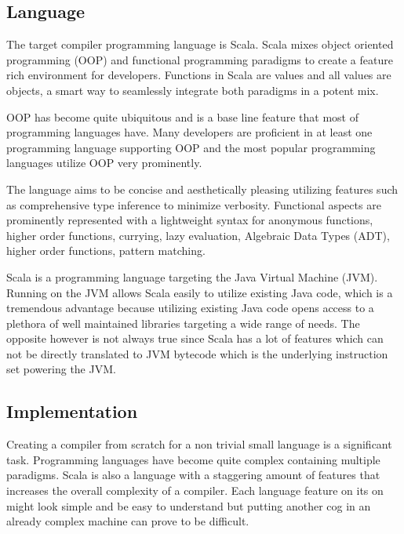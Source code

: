 \documentclass{VUMIFPSbakalaurinis}
\begin{document}
\subsection{Language}
The target compiler programming language is Scala.
Scala mixes object oriented programming (OOP)  and functional programming paradigms to create a feature rich environment for developers.
Functions in Scala are values and all values are objects, a smart way to seamlessly integrate both paradigms in a potent mix.

OOP has become quite ubiquitous and is a base line feature that most of programming languages have.
Many developers are proficient in at least one programming language supporting OOP and the most popular programming languages utilize OOP very prominently.

The language aims to be concise and aesthetically pleasing utilizing features such as comprehensive type inference to minimize verbosity.
Functional aspects are prominently represented with a lightweight syntax for anonymous functions, higher order functions, currying, lazy evaluation, Algebraic Data Types (ADT), higher order functions, pattern matching.

Scala is a programming language targeting the Java Virtual Machine (JVM).
Running on the JVM allows Scala easily to utilize existing Java code, which is a tremendous advantage because utilizing existing Java code opens access to a plethora of well maintained libraries targeting a wide range of needs.
The opposite however is not always true since Scala has a lot of features which can not be directly translated to JVM bytecode which is the underlying instruction set powering the JVM.

\subsection{Implementation}
Creating a compiler from scratch for a non trivial small language is a significant task.
Programming languages have become quite complex containing multiple paradigms.
Scala is also a language with a staggering amount of features that increases the overall complexity of a compiler.
Each language feature on its on might look simple and be easy to understand but putting another cog in an already complex machine can prove to be difficult.
\end{document}
